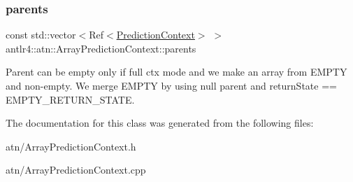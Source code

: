 \subsubsection{\texorpdfstring{parents}{parents}}
{\footnotesize\ttfamily const std\+::vector$<$Ref$<$\hyperlink{classantlr4_1_1atn_1_1PredictionContext}{Prediction\+Context}$>$ $>$ antlr4\+::atn\+::\+Array\+Prediction\+Context\+::parents}

Parent can be empty only if full ctx mode and we make an array from E\+M\+P\+TY and non-\/empty. We merge E\+M\+P\+TY by using null parent and return\+State == E\+M\+P\+T\+Y\+\_\+\+R\+E\+T\+U\+R\+N\+\_\+\+S\+T\+A\+TE. 

The documentation for this class was generated from the following files\+:\begin{DoxyCompactItemize}
\item 
atn/Array\+Prediction\+Context.\+h\item 
atn/Array\+Prediction\+Context.\+cpp\end{DoxyCompactItemize}
